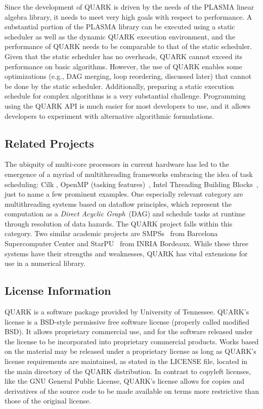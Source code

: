 \documentclass[11pt,letterpaper]{report}
\begin{document}
Since the development of QUARK is driven by the needs of the PLASMA
linear algebra library, it needs to meet very high goals with respect
to performance.  A substantial portion of the PLASMA library can be
executed using a static scheduler as well as the dynamic QUARK
execution environment, and the performance of QUARK needs to be
comparable to that of the static scheduler.  Given that the static
scheduler has no overheads, QUARK cannot exceed its performance on
basic algorithms.  However, the use of QUARK enables some
optimizations (e.g., DAG merging, loop reordering, discussed later)
that cannot be done by the static scheduler.  Additionally, preparing
a static execution schedule for complex algorithms is a very
substantial challenge.  Programming using the QUARK API is much easier
for most developers to use, and it allows developers to experiment
with alternative algorithmic formulations.

\subsection{Related Projects}

The ubiquity of multi-core processors in current hardware has led to
the emergence of a myriad of multithreading frameworks embracing the
idea of task scheduling: Cilk \cite{Blumofe:1995:Cilk:-an-efficient},
OpenMP (tasking features)~\cite{:2008:OpenMP-Application}, Intel
Threading Building Blocks~\cite{Reinders:2007:Intel-threading}, just
to name a few prominent examples.  One especially relevant category
are multithreading systems based on {dataflow} principles, which
represent the computation as a {\em Direct Acyclic Graph}~(DAG) and
schedule tasks at runtime through resolution of data hazards. The
QUARK project falls within this category. Two similar academic
projects are SMPSs~\cite{Perez:2008:A-dependency-aware-task-based}
from Barcelona Supercomputer Center and
StarPU~\cite{Augonnet:2009:StarPU:-A-Unified} from INRIA Bordeaux.
While these three systems have their strengths and weaknesses, QUARK
has vital extensions for use in a numerical library.


\subsection{License Information}

QUARK is a software package provided by University of Tennessee.
QUARK's license is a BSD-style permissive free software license
(properly called modified BSD).  It allows proprietary commercial use,
and for the software released under the license to be incorporated
into proprietary commercial products.  Works based on the material may
be released under a proprietary license as long as QUARK's license
requirements are maintained, as stated in the LICENSE file, located in
the main directory of the QUARK distribution.  In contrast to copyleft
licenses, like the GNU General Public License, QUARK's license allows
for copies and derivatives of the source code to be made available on
terms more restrictive than those of the original license.
\end{document}
